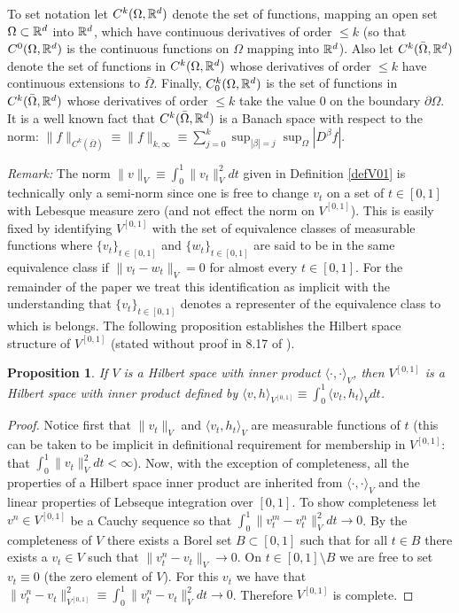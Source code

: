 \documentclass[noinfoline]{imsart}
\newtheorem{proposition}{Proposition}
\begin{document}
To set notation  let $C^k(\Omega, \Bbb R^d)$ denote the set of functions, mapping an open set $\Omega\subset \Bbb R^d$ into $\Bbb R^d$, which have continuous derivatives of order $\leq k$ (so that $C^0(\Omega, \Bbb R^d)$ is the continuous functions on $\Omega$ mapping into $\Bbb R^d$).
Also let $C^k(\bar\Omega,\Bbb R^d)$ denote the set of functions in $C^k(\Omega,\Bbb R^d)$ whose derivatives of order $\leq k$ have continuous extensions to $\bar\Omega$. Finally, $C_0^k(\Omega,\Bbb R^d)$ is the set of functions in $C^k(\bar\Omega,\Bbb R^d)$ whose derivatives of order $\leq k$ take the value $0$ on the boundary $\partial \Omega$. It is a well known fact that  $C^k(\bar\Omega,\Bbb R^d)$ is a Banach space with respect to the norm:  $ \| f \|_{C^k(\bar \Omega)}\equiv \| f \|_{k,\infty}\equiv \sum_{j=0}^k \sup_{|\beta|=j}\sup_{\Omega} |D^\beta f|$.



{\em Remark:} The norm $\| v\|_V\equiv \int_0^1 \| v_t\|^2_V dt $ given in Definition \ref{defV01} is technically only a semi-norm since one is free to change $v_t$  on a set of $t\in[0,1]$ with Lebesque measure zero (and not effect the norm on $V^{[0,1]}$). This is easily fixed by identifying  $V^{[0,1]}$ with the set of equivalence classes of measurable functions where $\{v_t\}_{t\in [0,1]}$ and $\{w_t\}_{t\in [0,1]}$ are said to be in the same equivalence class if $\| v_t-w_t \|_V=0$ for almost every $t\in [0,1]$. For the remainder of the paper we treat this identification as implicit with the understanding that $\{v_t\}_{t\in[0,1]}$  denotes a representer of the equivalence class to which is belongs. The following proposition establishes the Hilbert space structure of $V^{[0,1]}$ (stated without proof in 8.17 of \cite{you:10}).

\begin{proposition}
\label{Hspace}
If $V$ is a Hilbert space with inner product $\langle\cdot, \cdot \rangle_V$, then
$V^{[0,1]}$ is a Hilbert space with inner product  defined by $\langle v,h \rangle_{V^{[0,1]}} \equiv\int_0^1 \langle  v_t, h_t\rangle_V dt$.
\end{proposition}

\begin{proof}
Notice first that $\| v_t\|_V$ and $\langle  v_t, h_t\rangle_V$ are measurable functions of $t$ (this can be taken to be implicit in definitional requirement for membership in $V^{[0,1]}$: that $\int_0^1 \| v_t \|^2_Vdt <\infty$). Now, with the exception of completeness, all the properties of a Hilbert space inner product are inherited from $\langle  \cdot , \cdot\rangle_V$ and the linear properties of Lebseque integration over $[0,1]$. 
To show completeness  let $v^n\in V^{[0,1]}$ be a Cauchy sequence so that $\int_0^1 \| v_t^m - v_t^n \|^2_V dt\rightarrow 0$. By the completeness of $V$ there exists a Borel set $B\subset[0,1]$ such that for all $t\in B$ there exists a $v_t\in V$ such that $\|v_t^n - v_t\|_V\rightarrow 0$. On $t\in [0,1]\setminus B$ we are free to set $v_t\equiv 0$ (the zero element of $V$). For this $v_t$ we have that $\|v^n_t - v_t \|_{V^{[0,1]}}^2\equiv \int_0^1 \| v_t^n - v_t \|^2_V dt\rightarrow 0$. Therefore $V^{[0,1]}$ is complete.
\end{proof}
\end{document}
